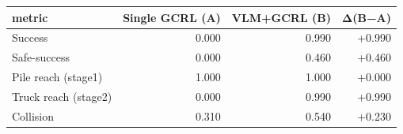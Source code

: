 \begin{tabular}{lrrr}
\toprule
metric & Single GCRL (A) & VLM+GCRL (B) & Δ(B−A) \\
\midrule
Success & 0.000 & 0.990 & +0.990 \\
Safe-success & 0.000 & 0.460 & +0.460 \\
Pile reach (stage1) & 1.000 & 1.000 & +0.000 \\
Truck reach (stage2) & 0.000 & 0.990 & +0.990 \\
Collision & 0.310 & 0.540 & +0.230 \\
\bottomrule
\end{tabular}
